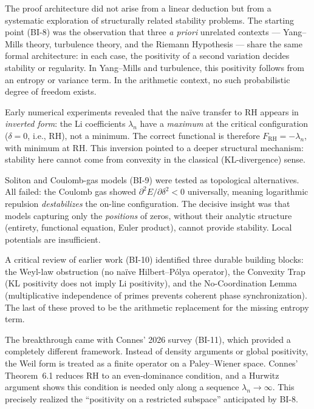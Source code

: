 \documentclass[12pt,a4paper]{article}
\theoremstyle{definition}
\theoremstyle{remark}
\begin{document}
The proof architecture did not arise from a linear deduction but from a systematic exploration of structurally related stability problems. The starting point (BI-8) was the observation that three \emph{a priori} unrelated contexts --- Yang--Mills theory, turbulence theory, and the Riemann Hypothesis --- share the same formal architecture: in each case, the positivity of a second variation decides stability or regularity. In Yang--Mills and turbulence, this positivity follows from an entropy or variance term. In the arithmetic context, no such probabilistic degree of freedom exists.

Early numerical experiments revealed that the na\"ive transfer to RH appears in \emph{inverted form}: the Li coefficients $\lambda_n$ have a \emph{maximum} at the critical configuration ($\delta = 0$, i.e., RH), not a minimum. The correct functional is therefore $F_{\mathrm{RH}} = -\lambda_n$, with minimum at RH. This inversion pointed to a deeper structural mechanism: stability here cannot come from convexity in the classical (KL-divergence) sense.

Soliton and Coulomb-gas models (BI-9) were tested as topological alternatives. All failed: the Coulomb gas showed $\partial^2 E/\partial\delta^2 < 0$ universally, meaning logarithmic repulsion \emph{destabilizes} the on-line configuration. The decisive insight was that models capturing only the \emph{positions} of zeros, without their analytic structure (entirety, functional equation, Euler product), cannot provide stability. Local potentials are insufficient.

A critical review of earlier work (BI-10) identified three durable building blocks: the Weyl-law obstruction (no na\"ive Hilbert--P\'olya operator), the Convexity Trap (KL positivity does not imply Li positivity), and the No-Coordination Lemma (multiplicative independence of primes prevents coherent phase synchronization). The last of these proved to be the arithmetic replacement for the missing entropy term.

The breakthrough came with Connes' 2026 survey \cite{Connes2026} (BI-11), which provided a completely different framework. Instead of density arguments or global positivity, the Weil form is treated as a finite operator on a Paley--Wiener space. Connes' Theorem~6.1 reduces RH to an even-dominance condition, and a Hurwitz argument shows this condition is needed only along a sequence $\lambda_n \to \infty$. This precisely realized the ``positivity on a restricted subspace'' anticipated by BI-8.
\end{document}
